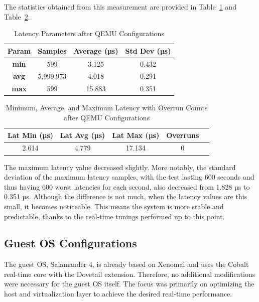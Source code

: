 \documentclass[MMR,Master,english]{style/twbook}
\begin{document}
\clearpage

\noindent The statistics obtained from this measurement are provided in Table~\ref{tab:latency_stats_virt_qemu} and Table~\ref{tab:latency_overrun_msw_new_virt_qemu}.

\begin{table}[H]
	\centering
	\caption{Latency Parameters after QEMU Configurations}
	\label{tab:latency_stats_virt_qemu}
	\begin{tabular}{|c|c|c|c|}
		\hline
		\textbf{Param} & \textbf{Samples} & \textbf{Average (µs)} & \textbf{Std Dev (µs)} \\ \hline
		\textbf{min}   & 599              & 3.125                 & 0.432                 \\ \hline
		\textbf{avg}   & 5,999,973        & 4.018                 & 0.291                 \\ \hline
		\textbf{max}   & 599              & 15.883                & 0.351                 \\ \hline
	\end{tabular}
\end{table}

\begin{table}[H]
	\centering
	\caption[Latency Statistics with Overrun Counts after QEMU Configurations]{Minimum, Average, and Maximum Latency with Overrun Counts after QEMU Configurations}
	\label{tab:latency_overrun_msw_new_virt_qemu}
	\begin{tabular}{|c|c|c|c|c|}
		\hline
		\textbf{Lat Min (µs)} & \textbf{Lat Avg (µs)} & \textbf{Lat Max (µs)} & \textbf{Overruns} \\ \hline
		2.614                 & 4.779                 & 17.134                & 0                 \\ \hline
	\end{tabular}
\end{table}

\noindent The maximum latency value decreased slightly. More notably, the standard deviation of the maximum latency samples, with the test lasting 600 seconds and thus having 600 worst latencies for each second, also decreased from 1.828 µs to 0.351 µs. Although the difference is not much, when the latency values are this small, it becomes noticeable. This means the system is more stable and predictable, thanks to the real-time tunings performed up to this point. 

\subsection{Guest OS Configurations}\label{subsec:guest_configurations}
The guest OS, Salamander 4, is already based on Xenomai and uses the Cobalt real-time core with the Dovetail extension. Therefore, no additional modifications were necessary for the guest OS itself. The focus was primarily on optimizing the host and virtualization layer to achieve the desired real-time performance.
\end{document}
